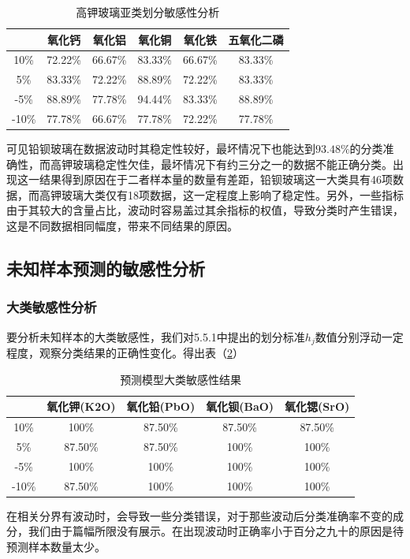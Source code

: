 \documentclass{my_paper}
\begin{document}
\begin{longtable}{cccccc}
  \caption{高钾玻璃亚类划分敏感性分析}
  \label{senk} \\
  \toprule
  & 氧化钙 & 氧化铝   & 氧化铜   & 氧化铁   & 五氧化二磷 \\\midrule
  10\%  & 72.22\% & 66.67\% & 83.33\% & 66.67\% & 83.33\% \\
  5\%   & 83.33\% & 72.22\% & 88.89\% & 72.22\% & 83.33\% \\
  -5\%  & 88.89\% & 77.78\% & 94.44\% & 83.33\% & 88.89\% \\
  -10\% & 77.78\% & 66.67\% & 77.78\% & 72.22\% & 77.78\% \\
  \bottomrule
  \end{longtable} 

可见铅钡玻璃在数据波动时其稳定性较好，最坏情况下也能达到$93.48\%$的分类准确性，而高钾玻璃稳定性欠佳，最坏情况下有约三分之一的数据不能正确分类。出现这一结果得到原因在于二者样本量的数量有差距，铅钡玻璃这一大类具有46项数据，而高钾玻璃大类仅有18项数据，这一定程度上影响了稳定性。另外，一些指标由于其较大的含量占比，波动时容易盖过其余指标的权值，导致分类时产生错误，这是不同数据相同幅度，带来不同结果的原因。

\subsection{未知样本预测的敏感性分析}

\subsubsection{大类敏感性分析}
要分析未知样本的大类敏感性，我们对5.5.1中提出的划分标准$h_j$数值分别浮动一定程度，观察分类结果的正确性变化。得出表（\ref{sen2}）
\begin{longtable}{ccccc}
\caption{预测模型大类敏感性结果}
\label{sen2} \\
\toprule
& 氧化钾(K2O) & 氧化铅(PbO) & 氧化钡(BaO) & 氧化锶(SrO) \\\midrule
10\%  & 100\%    & 87.50\%  & 87.50\%  & 87.50\%  \\
5\%   & 87.50\%  & 87.50\%  & 100\%    & 100\%    \\
-5\%  & 100\%    & 100\%    & 100\%    & 100\%    \\
-10\% & 87.50\%  & 100\%    & 100\%    & 100\%    \\
\bottomrule
\end{longtable}  
在相关分界有波动时，会导致一些分类错误，对于那些波动后分类准确率不变的成分，我们由于篇幅所限没有展示。在出现波动时正确率小于百分之九十的原因是待预测样本数量太少。
\end{document}
